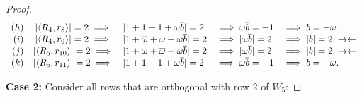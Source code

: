 \begin{lemma}
\begin{proof}
$$\begin{array}{rcllll}
      (h) & |\langle R_{4},r_{8}\rangle|=2 \implies & |1+1+1+\omega\overline{b}|=2            &\implies \omega\overline{b} = -1          &\implies b = -\omega.          \\
      (i) & |\langle R_{4},r_{9}\rangle|=2 \implies & |1+\overline{\omega}+\omega+\omega\overline{b}|=2      &\implies |\omega\overline{b}| = 2         &\implies |b| = 2.   \rightarrow\leftarrow \\
      (j) & |\langle R_{5},r_{10}\rangle|=2 \implies & |1+\omega+\overline{\omega}+\omega\overline{b}|=2      &\implies |\omega\overline{b}| = 2         &\implies |b| = 2.   \rightarrow\leftarrow \\
      (k) & |\langle R_{5},r_{11}\rangle|=2 \implies & |1+1+1+\omega\overline{b}|=2            &\implies \omega\overline{b} = -1          &\implies b = -\omega.
     \end{array}
     $$

  {\bf Case 2:} Consider all rows that are orthogonal with row 2 of $W_5$:


\end{proof}
\end{lemma}
